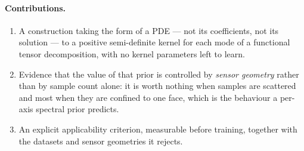 \paragraph{Contributions.}
\begin{enumerate}
  \item A construction taking the form of a PDE --- not its coefficients, not its
        solution --- to a positive semi-definite kernel for each mode of a
        functional tensor decomposition, with no kernel parameters left to learn.
  \item Evidence that the value of that prior is controlled by \emph{sensor
        geometry} rather than by sample count alone: it is worth nothing when
        samples are scattered and most when they are confined to one face, which
        is the behaviour a per-axis spectral prior predicts.
  \item An explicit applicability criterion, measurable before training, together
        with the datasets and sensor geometries it rejects.
\end{enumerate}
